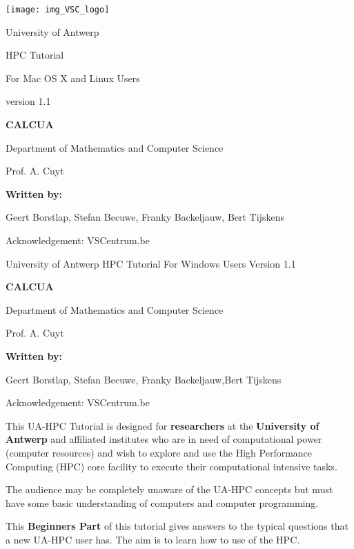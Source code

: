 \texttt{[image: img\_VSC\_logo]}

University of Antwerp

HPC Tutorial

For Mac OS X and Linux Users

version 1.1


\textbf{CALCUA}

Department of Mathematics and Computer Science

Prof. A. Cuyt



\textbf{Written by:}

Geert Borstlap, Stefan Becuwe, Franky Backeljauw, Bert Tijskens

Acknowledgement: VSCentrum.be


University of Antwerp
HPC Tutorial
For Windows Users
Version 1.1

\textbf{CALCUA}

Department of Mathematics and Computer Science

Prof. A. Cuyt



\textbf{Written by:}

Geert Borstlap, Stefan Becuwe, Franky Backeljauw,Bert Tijskens



Acknowledgement: VSCentrum.be

\textbf{}

This UA-HPC Tutorial is designed for \textbf{researchers} at the \textbf{University of Antwerp} and affiliated institutes who are in need of computational power (computer resources) and wish to explore and use the High Performance Computing (HPC) core facility to execute their computational intensive tasks.


The audience may be completely unaware of the UA-HPC concepts but must have some basic understanding of computers and computer programming.


\textbf{}

This \textbf{Beginners Part} of this tutorial gives answers to the typical questions that a new UA-HPC user has. The aim is to learn how to use of the HPC.

